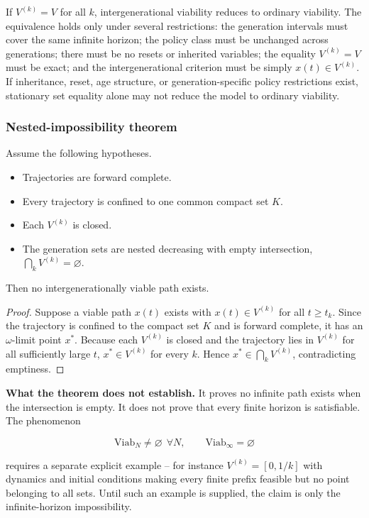 If $V^{(k)} = V$ for all $k$, intergenerational viability reduces to ordinary viability. The equivalence holds only under several restrictions: the generation intervals must cover the same infinite horizon; the policy class must be unchanged across generations; there must be no resets or inherited variables; the equality $V^{(k)} = V$ must be exact; and the intergenerational criterion must be simply $x(t) \in V^{(k)}$. If inheritance, reset, age structure, or generation-specific policy restrictions exist, stationary set equality alone may not reduce the model to ordinary viability.

\subsubsection{Nested-impossibility theorem}

\begin{theorem}\label{thm:si:nested}
Assume the following hypotheses.
\begin{itemize}[leftmargin=3em]
\item[(H1)] Trajectories are forward complete.
\item[(H2)] Every trajectory is confined to one common compact set $K$.
\item[(H3)] Each $V^{(k)}$ is closed.
\item[(H4)] The generation sets are nested decreasing with empty intersection, $\bigcap_k V^{(k)} = \varnothing$.
\end{itemize}
Then no intergenerationally viable path exists.
\end{theorem}
\begin{proof}
Suppose a viable path $x(t)$ exists with $x(t) \in V^{(k)}$ for all $t \ge t_k$. Since the trajectory is confined to the compact set $K$ and is forward complete, it has an $\omega$-limit point $x^\ast$. Because each $V^{(k)}$ is closed and the trajectory lies in $V^{(k)}$ for all sufficiently large $t$, $x^\ast\in V^{(k)}$ for every $k$. Hence $x^\ast\in\bigcap_k V^{(k)}$, contradicting emptiness.
\end{proof}

\textbf{What the theorem does not establish.} It proves no infinite path exists when the intersection is empty. It does not prove that every finite horizon is satisfiable. The phenomenon

\[\mathrm{Viab}_N \neq \varnothing \ \ \forall N, \qquad \mathrm{Viab}_\infty = \varnothing\]

requires a separate explicit example -- for instance $V^{(k)} = [0, 1/k]$ with dynamics and initial conditions making every finite prefix feasible but no point belonging to all sets. Until such an example is supplied, the claim is only the infinite-horizon impossibility.

